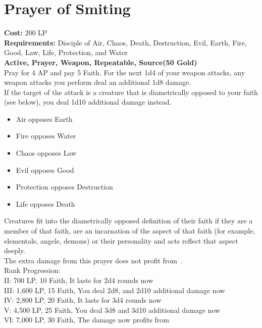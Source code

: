 \section{Prayer of Smiting}\label{prayer:smiting}
\textbf{Cost:} 200 LP\\
\textbf{Requirements:} Disciple of Air, Chaos, Death, Destruction, Evil, Earth, Fire, Good, Law, Life, Protection, and Water\\
\textbf{Active, Prayer, Weapon, Repeatable, Source(50 Gold)}\\
Pray for 4 AP and pay 5 Faith.
For the next 1d4 of your weapon attacks, any weapon attacks you perform deal an additional 1d8 damage.\\
If the target of the attack is a creature that is diametrically opposed to your faith (see below), you deal 1d10 additional damage instead.\\
\begin{itemize}
    \item Air opposes Earth
    \item Fire opposes Water
    \item Chaos opposes Law
    \item Evil opposes Good
    \item Protection opposes Destruction
    \item Life opposes Death
\end{itemize}
Creatures fit into the diametrically opposed definition of their faith if they are a member of that faith, are an incarnation of the aspect of that faith (for example, elementals, angels, demons) or their personality and acts reflect that aspect deeply.\\
The extra damage from this prayer does not profit from~.
\\
Rank Progression:\\
II: 700 LP, 10 Faith, It lasts for 2d4 rounds now\\
III: 1,600 LP, 15 Faith, You deal 2d8, and 2d10 additional damage now\\
IV: 2,800 LP, 20 Faith, It lasts for 3d4 rounds now\\
V: 4,500 LP, 25 Faith, You deal 3d8 and 3d10 additional damage now\\
VI: 7,000 LP, 30 Faith, The damage now profits from ~\\